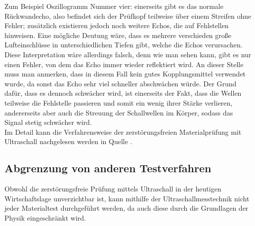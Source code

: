 \documentclass[reducespace,stylepage,semiarbeit]{spezidoc}
\begin{document}
Zum Beispiel Oszillogramm Nummer vier: einerseits gibt es das normale Rückwandecho, also befindet sich der Prüfkopf teilweise über einem Streifen ohne Fehler; zusätzlich existieren jedoch noch weitere Echos, die auf Fehlstellen hinweisen. 
Eine mögliche Deutung wäre, dass es mehrere verschieden große Lufteinschlüsse in unterschiedlichen Tiefen gibt, welche die Echos verursachen. 
Diese Interpretation wäre allerdings falsch, denn wie man sehen kann, gibt es nur einen Fehler, von dem das Echo immer wieder reflektiert wird. 
An dieser Stelle muss man anmerken, dass in diesem Fall kein gutes Kopplungsmittel verwendet wurde, da sonst das Echo sehr viel schneller abschwächen würde. 
Der Grund dafür, dass es dennoch schwächer wird, ist einerseits der Fakt, dass die Wellen teilweise die Fehlstelle passieren und somit ein wenig ihrer Stärke verlieren, andererseits aber auch die Streuung der Schallwellen im Körper, sodass das Signal stetig schwächer wird.\\
Im Detail kann die Verfahrensweise der zerstörungsfreien Materialprüfung mit Ultraschall nachgelesen werden in Quelle 
\cite{karldeutsch}. %

\subsection{Abgrenzung von anderen Testverfahren}

Obwohl die zerstörungsfreie Prüfung mittels Ultraschall in der heutigen Wirtschaftslage unverzichtbar ist, kann mithilfe der Ultraschallmesstechnik nicht jeder Materialtest durchgeführt werden, da auch diese durch die Grundlagen der Physik eingeschränkt wird.
\end{document}
